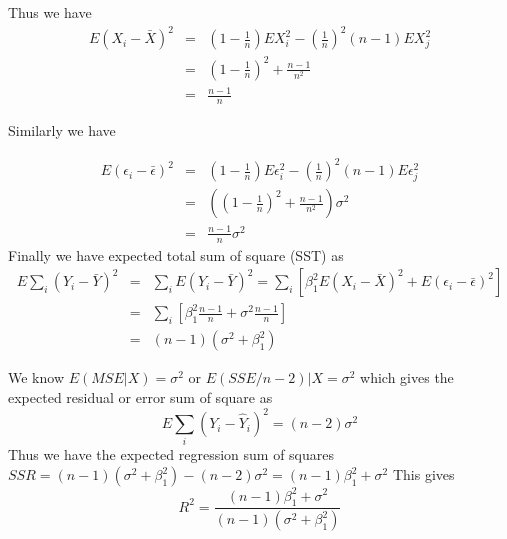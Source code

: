 \documentclass[11pt]{article}
\begin{document}
Thus we have 
\begin{eqnarray*}
E(X_i-\bar{X})^2 & = & (1-\frac1n)EX_i^2 - \left( \frac1n \right )^2 (n-1) EX_j^2 \\
                 & = & (1-\frac1n)^2+ \frac{n-1}{n^2}\\
                 & = & \frac{n-1}{n}
\end{eqnarray*}

Similarly we have 

\begin{eqnarray*}
E(\epsilon_i-\bar{\epsilon})^2 & = & (1-\frac1n)E\epsilon_i^2 - \left( \frac1n \right )^2 (n-1) E\epsilon_j^2 \\
                 & = & \left((1-\frac1n)^2+ \frac{n-1}{n^2} \right) \sigma^2 \\
                 & = & \frac{n-1}{n}\sigma^2
\end{eqnarray*}
Finally we have expected total sum of square (SST) as
\begin{eqnarray*}
E\sum_i{(Y_i-\bar{Y})^2} & = & \sum_i E(Y_i-\bar{Y})^2=\sum_i \left [ \beta_1^2 E(X_i-\bar{X})^2 + E(\epsilon_i-\bar{\epsilon})^2 \right] \\
                 & = & \sum_i\left[ \beta_1^2 \frac{n-1}{n}+  \sigma^2 \frac{n-1}{n}\right]\\
                 & = & (n-1)(\sigma^2+\beta_1^2)
\end{eqnarray*}

We know $E(MSE|X) = \sigma^2$ or $E(SSE/n-2)|X = \sigma^2$ which gives the expected residual or error sum of square as $$E \sum_i (Y_i-\hat Y_i)^2=(n-2)\sigma^2$$
Thus we have the expected regression sum of squares $SSR =  (n-1)(\sigma^2+\beta_1^2) - (n-2)\sigma^2 = (n-1) \beta_1^2+\sigma^2$ This gives $$R^2=\frac{(n-1) \beta_1^2+\sigma^2}{ (n-1)(\sigma^2+\beta_1^2)}$$
\end{document}
